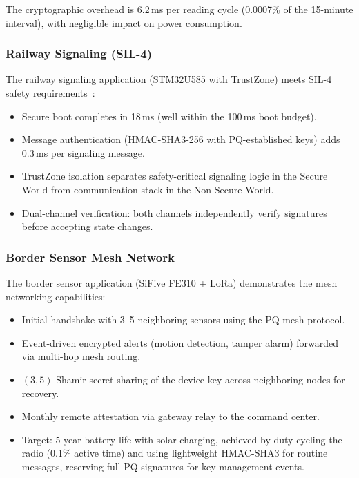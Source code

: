 \documentclass[conference,10pt]{IEEEtran}
\begin{document}
The cryptographic overhead is 6.2\,ms per reading cycle (0.0007\% of the 15-minute interval), with negligible impact on power consumption.

\subsubsection{Railway Signaling (SIL-4)}

The railway signaling application (STM32U585 with TrustZone) meets SIL-4 safety requirements~\cite{iec61508,en50129}:
\begin{itemize}[leftmargin=*]
  \item Secure boot completes in 18\,ms (well within the 100\,ms boot budget).
  \item Message authentication (HMAC-SHA3-256 with PQ-established keys) adds 0.3\,ms per signaling message.
  \item TrustZone isolation separates safety-critical signaling logic in the Secure World from communication stack in the Non-Secure World.
  \item Dual-channel verification: both channels independently verify signatures before accepting state changes.
\end{itemize}

\subsubsection{Border Sensor Mesh Network}

The border sensor application (SiFive FE310 + LoRa) demonstrates the mesh networking capabilities:
\begin{itemize}[leftmargin=*]
  \item Initial handshake with 3--5 neighboring sensors using the PQ mesh protocol.
  \item Event-driven encrypted alerts (motion detection, tamper alarm) forwarded via multi-hop mesh routing.
  \item $(3, 5)$ Shamir secret sharing of the device key across neighboring nodes for recovery.
  \item Monthly remote attestation via gateway relay to the command center.
  \item Target: 5-year battery life with solar charging, achieved by duty-cycling the radio (0.1\% active time) and using lightweight HMAC-SHA3 for routine messages, reserving full PQ signatures for key management events.
\end{itemize}
\end{document}
